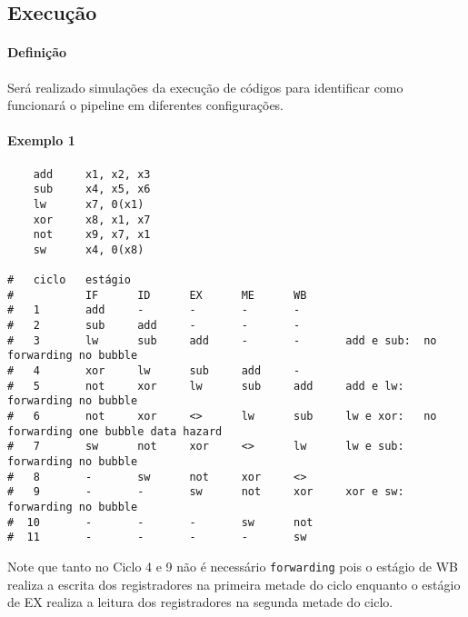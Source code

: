 \documentclass{article}
\begin{document}
\subsection{Execução}
\paragraph{Definição}Será realizado simulações da execução de códigos para identificar como funcionará o pipeline em diferentes configurações.
\paragraph{Exemplo 1}
\begin{scriptsize}
    \myStyleRISCV
    \begin{lstlisting}
    add     x1, x2, x3
    sub     x4, x5, x6
    lw      x7, 0(x1)
    xor     x8, x1, x7
    not     x9, x7, x1
    sw      x4, 0(x8)

#   ciclo   estágio
#           IF      ID      EX      ME      WB  
#   1       add     -       -       -       -   
#   2       sub     add     -       -       -   
#   3       lw      sub     add     -       -       add e sub:  no forwarding no bubble
#   4       xor     lw      sub     add     -   
#   5       not     xor     lw      sub     add     add e lw:      forwarding no bubble
#   6       not     xor     <>      lw      sub     lw e xor:   no forwarding one bubble data hazard
#   7       sw      not     xor     <>      lw      lw e sub:      forwarding no bubble
#   8       -       sw      not     xor     <>  
#   9       -       -       sw      not     xor     xor e sw:      forwarding no bubble
#  10       -       -       -       sw      not 
#  11       -       -       -       -       sw  
    \end{lstlisting}
\end{scriptsize}
Note que tanto no Ciclo 4 e 9 não é necessário \texttt{forwarding} pois o estágio de WB realiza a escrita dos registradores na primeira metade do ciclo enquanto o estágio de EX realiza a leitura dos registradores na segunda metade do ciclo.
\end{document}
